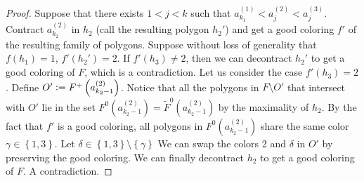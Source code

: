 \documentclass[12pt]{article}
\theoremstyle{definition}
\newcommand{\defeq}{\vcentcolon=}
\begin{document}
\begin{proof}
         Suppose that there exists
         $1 < j < k$ such that
         $a_{k_1}^{\left(1\right)} <
         a_{j}^{\left(2\right)} <
         a_{j}^{\left(3\right)}$.
         Contract $a_{k_2}^{\left(2\right)}$ 
         in $h_2$ (call the resulting
         polygon $h_2'$)
         and get a good coloring
         $f'$ of the resulting family
         of polygons.
         Suppose without loss of
         generality that $f\left(h_1\right) = 1$,
         $f'\left(h_2'\right) = 2$.
         If $f'\left(h_3\right) \neq 2$, 
         then we can decontract $h_2'$ 
         to get a good coloring of $F$, 
         which is a contradiction.
         Let us consider the case
         $f'\left(h_3\right) = 2$.
         Define $O' \defeq F^{+}\left(a_{k_2 - 1}^{\left(2\right)}\right)$.
         Notice that all the polygons in
         $F \setminus O'$ that intersect with
         $O'$ lie in the set 
         $F^{0}\left(a_{k_2-1}^{\left(2\right)}\right) =
         \widetilde{F}^{0}\left(a_{k_2-1}^{\left(2\right)}\right)$
         by the maximality of $h_2$.
         By the fact that $f'$ is a
         good coloring, all polygons in $F^{0}\left(
         a_{k_2-1}^{\left(2\right)}\right)$
         share the same color $\gamma \in \left\{1, 3\right\}$.
         Let $\delta \in \left\{1, 3\right\} 
         \setminus \left\{\gamma\right\}$
         We can swap the colors 2 and $\delta$
         in $O'$ by preserving the good coloring.
         We can finally decontract $h_2$ to get
         a good coloring of $F$. 
         A contradiction.


\end{proof}
\end{document}
